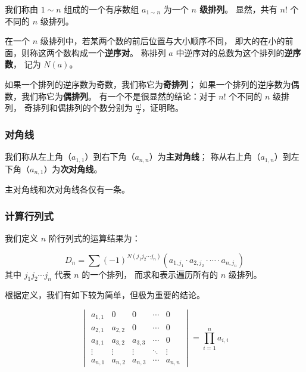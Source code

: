 \documentclass[UTF8]{article}
\begin{document}
	我们称由 $1 \sim n$ 组成的一个有序数组
	$a_{1 \sim n}$ 为一个 \textbf{$n$ 级排列}。 
	显然，共有 $n!$ 个不同的 $n$ 级排列。

	在一个 $n$ 级排列中，若某两个数的前后位置与大小顺序不同，
	即大的在小的前面，则称这两个数构成一个\textbf{逆序对}。
	称排列 $a$ 中逆序对的总数为这个排列的\textbf{逆序数}，
	记为 $N(a)$。

	如果一个排列的逆序数为奇数，我们称它为\textbf{奇排列}；
	如果一个排列的逆序数为偶数，我们称它为\textbf{偶排列}。
	有一个不是很显然的结论：对于 $n!$ 个不同的 $n$ 级排列，
	奇排列和偶排列的个数分别为 $\frac {n!} {2}$，证明略。

	\subsubsection{对角线}

	我们称从左上角（$a_{1, 1}$）到右下角（$a_{n, n}$）为\textbf{主对角线}；
	称从右上角（$a_{1, n}$）到左下角（$a_{n, 1}$）为\textbf{次对角线}。

	主对角线和次对角线各仅有一条。

	\subsubsection{计算行列式}

	我们定义 $n$ 阶行列式的运算结果为：

	\begin{equation*}
		D_n =
		\sum (-1)^{N(j_1 j_2 \cdots j_n)}
		(a_{1, j_1} \cdot a_{2, j_2} \cdot \cdots \cdot a_{n, j_n})
	\end{equation*}
	其中 $j_1 j_2 \cdots j_n$ 代表 $n$ 的一个排列，
	而求和表示遍历所有的 $n$ 级排列。

	\bigskip

	根据定义，我们有如下较为简单，但极为重要的结论。


	\begin{equation*}
		\begin{vmatrix}
			a_{1, 1} & 0 & 0 & \cdots & 0
			\\
			a_{2, 1} & a_{2, 2} & 0 & \cdots & 0
			\\
			a_{3, 1} & a_{3, 2} & a_{3, 3} & \cdots & 0
			\\
			\vdots & \vdots & \vdots & \ddots & \vdots
			\\
			a_{n, 1} & a_{n, 2} & a_{n, 3} & \cdots & a_{n, n}
		\end{vmatrix}
		=
		\prod_{i = 1}^{n} a_{i, i}
	\end{equation*}
\end{document}
